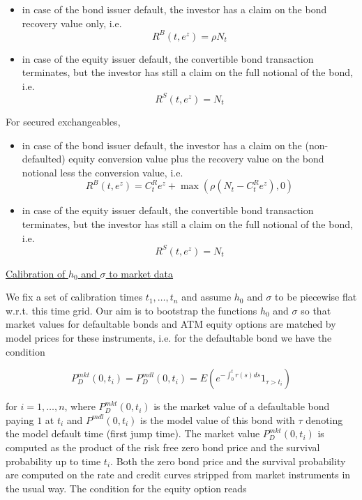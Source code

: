 \begin{itemize}
\item in case of the bond issuer default, the investor has a claim on the bond recovery value only, i.e.
  $$R^B(t,e^z) = \rho N_t$$
\item in case of the equity issuer default, the convertible bond transaction terminates, but the investor has still a claim on
  the full notional of the bond, i.e.
  $$R^S(t,e^z) = N_t$$
\end{itemize}

For secured exchangeables,

\begin{itemize}
\item in case of the bond issuer default, the investor has a claim on the (non-defaulted) equity conversion value plus
  the recovery value on the bond notional less the conversion value, i.e.
  $$R^B(t,e^z) = C^R_t e^z + \max( \rho(N_t - C^R_t e^z),0) $$
\item in case of the equity issuer default, the convertible bond transaction terminates, but the investor has still a claim on
  the full notional of the bond, i.e.
  $$R^S(t,e^z) = N_t$$
\end{itemize}

\underline{Calibration of $h_0$ and $\sigma$ to market data}

We fix a set of calibration times $t_1, \ldots, t_n$ and assume $h_0$ and $\sigma$ to be piecewise flat w.r.t. this time
grid. Our aim is to bootstrap the functions $h_0$ and $\sigma$ so that market values for defaultable bonds and ATM
equity options are matched by model prices for these instruments, i.e. for the defaultable bond we have the condition

\begin{equation}\label{formula:convertible_bond_defbond_match}
  P^{mkt}_D(0,t_i) = P^{mdl}_D(0,t_i) = E \left( e^{-\int_0^t r(s) ds} 1_{\tau > t_i} \right)
\end{equation}

for $i=1,\ldots,n$, where $P^{mkt}_D(0,t_i)$ is the market value of a defaultable bond paying $1$ at $t_i$ and
$P^{mdl}(0,t_i)$ is the model value of this bond with $\tau$ denoting the model default time (first jump time). The
market value $P^{mkt}_D(0,t_i)$ is computed as the product of the risk free zero bond price and the survival probability
up to time $t_i$. Both the zero bond price and the survival probability are computed on the rate and credit curves
stripped from market instruments in the usual way. The condition for the equity option reads

